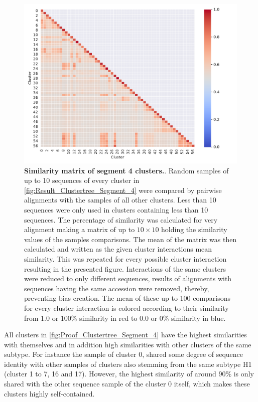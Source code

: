 \begin{figure}[!hbt]
    \centering
    \includegraphics[width=\textwidth]{Results/Cluster_Difference_Segment_4.pdf}
    \caption[Similarity matrix of segment 4 clusters]{\textbf{Similarity matrix of segment 4 clusters.}. Random samples of up to 10 sequences of every cluster in \autoref{fig:Result_Clustertree_Segment_4} were compared by pairwise alignments with the samples of all other clusters. Less than 10 sequences were only used in clusters containing less than 10 sequences. The percentage of similarity was calculated for very alignment making a matrix of up to $10\times10$ holding the similarity values of the samples comparisons. The mean of the matrix was then calculated and written as the given cluster interactions mean similarity. This was repeated for every possible cluster interaction resulting in the presented figure. Interactions of the same clusters were reduced to only different sequences, results of alignments with sequences having the same accession were removed, thereby, preventing bias creation. The mean of these up to 100 comparisons for every cluster interaction is colored according to their similarity from 1.0 or 100\% similarity in red to 0.0 or 0\% similarity in blue.}
    \label{fig:Proof_Clustertree_Segment_4}
\end{figure}

\vspace{1em}

All clusters in \autoref{fig:Proof_Clustertree_Segment_4} have the highest similarities with themselves and in addition high similarities with other clusters of the same subtype. For instance the sample of cluster 0, shared some degree of sequence identity with other samples of clusters also stemming from the same subtype H1 (cluster 1 to 7, 16 and 17). However, the highest similarity of around 90\% is only shared with the other sequence sample of the cluster 0 itself, which makes these clusters highly self-contained. 

